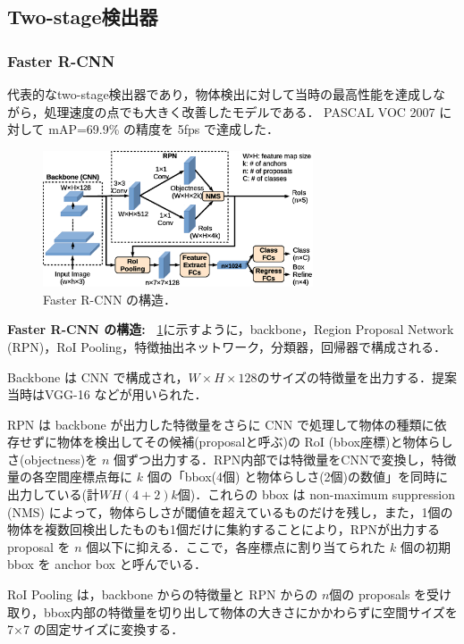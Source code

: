 \documentclass[originalpaper]{jsaiart}     %
\begin{document}
\subsection{Two-stage検出器}
\subsubsection{Faster R-CNN}
代表的なtwo-stage検出器であり，物体検出に対して当時の最高性能を達成しながら，処理速度の点でも大きく改善したモデルである\cite{RHGS15}．
PASCAL VOC 2007 に対して mAP=69.9\% の精度を 5fps で達成した．
\begin{figure}[tb]
    \begin{center}
        \includegraphics[width=8cm,clip]{fig/archi_FasterRCNN.eps}
    \end{center}
    \caption{ Faster R-CNN の構造．}
    \label{fig:archi_FasterRCNN}
\end{figure}

{\bf Faster R-CNN の構造:\ } \ref{fig:archi_FasterRCNN}に示すように，backbone，Region Proposal Network (RPN)，RoI Pooling，特徴抽出ネットワーク，分類器，回帰器で構成される．

Backbone は CNN で構成され，$W{\times}H{\times}128$のサイズの特徴量を出力する．提案当時はVGG-16 \cite{SimZis15}などが用いられた．

RPN は backbone が出力した特徴量をさらに CNN で処理して物体の種類に依存せずに物体を検出してその候補(proposalと呼ぶ)の RoI (bbox座標)と物体らしさ(objectness)を $n$ 個ずつ出力する．RPN内部では特徴量をCNNで変換し，特徴量の各空間座標点毎に $k$ 個の「bbox(4個) と物体らしさ(2個)の数値」を同時に出力している(計$WH(4{+}2)k$個)．これらの bbox は non-maximum suppression (NMS) によって，物体らしさが閾値を超えているものだけを残し，また，1個の物体を複数回検出したものも1個だけに集約することにより，RPNが出力するproposal を $n$ 個以下に抑える．ここで，各座標点に割り当てられた $k$ 個の初期 bbox を anchor box と呼んでいる．

RoI Pooling は，backbone からの特徴量と RPN からの $n$個の proposals を受け取り，bbox内部の特徴量を切り出して物体の大きさにかかわらずに空間サイズを 7{$\times$}7 の固定サイズに変換する．
\end{document}
